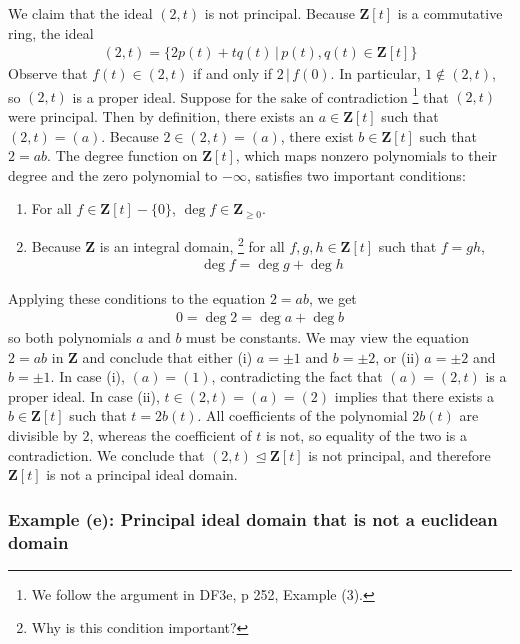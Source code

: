 \documentclass[oneside, english, 11pt]{article}
\newcommand{\divides}{\,|\,}
\newcommand{\idealeq}{\trianglelefteq}
\newcommand{\integers}{\mathbf{Z}}
\newcommand{\st}{\,|\,}
\newcommand{\Z}{\integers}
\begin{document}
{We claim that the ideal $(2, t)$ is not principal. Because $\Z[t]$ is a commutative ring, the ideal
\begin{align*}
(2, t) = \{2 p(t) + t q(t) \st p(t), q(t) \in \Z[t]\}
\end{align*}
Observe that $f(t) \in (2, t)$ if and only if $2 \divides f(0)$. In particular, $1 \notin (2, t)$, so $(2, t)$ is a proper ideal. Suppose for the sake of contradiction%
\footnote{We follow the argument in DF3e, p 252, Example (3).} %
that $(2, t)$ were principal. Then by definition, there exists an $a \in \Z[t]$ such that $(2, t) = (a)$. Because $2 \in (2 ,t) = (a)$, there exist $b \in \Z[t]$ such that $2 = a b$. The degree function on $\Z[t]$, which maps nonzero polynomials to their degree and the zero polynomial to $-\infty$, satisfies two important conditions:
\begin{enumerate}
\item For all $f \in \Z[t] - \{0\}$, $\deg f \in \Z_{\geq 0}$.
\item Because $\Z$ is an integral domain,%
\footnote{Why is this condition important?} %
for all $f, g, h \in \Z[t]$ such that $f = g h$,
\begin{align*}
\deg f
=
\deg g + \deg h
\end{align*}
\end{enumerate}
Applying these conditions to the equation $2 = a b$, we get
\begin{align*}
0
=
\deg 2
=
\deg a + \deg b
\end{align*}
so both polynomials $a$ and $b$ must be constants. We may view the equation $2 = a b$ in $\Z$ and conclude that either (i) $a = \pm{}1$ and $b = \pm{2}$, or (ii) $a = \pm{2}$ and $b = \pm{1}$. In case (i), $(a) = (1)$, contradicting the fact that $(a) = (2, t)$ is a proper ideal. In case (ii), $t \in (2, t) = (a) = (2)$ implies that there exists a $b \in \Z[t]$ such that $t = 2 b(t)$. All coefficients of the polynomial $2 b(t)$ are divisible by $2$, whereas the coefficient of $t$ is not, so equality of the two is a contradiction. We conclude that $(2, t) \idealeq \Z[t]$ is not principal, and therefore $\Z[t]$ is not a principal ideal domain.



\subsubsection*{Example (e): Principal ideal domain that is not a euclidean domain}

}
\end{document}
